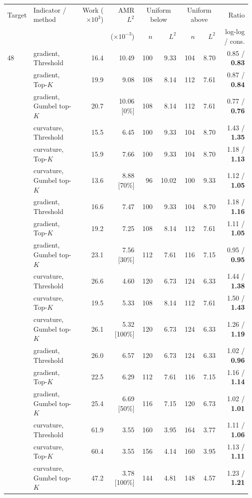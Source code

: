\begin{tabular}{llrrrrrrr}
\toprule
Target & Indicator / method & Work ($\times10^{3}$) & AMR $L^2$ & \multicolumn{2}{c}{Uniform below} & \multicolumn{2}{c}{Uniform above} & Ratio \\
 & & & ($\times10^{-3}$) & $n$ & $L^2$ & $n$ & $L^2$ & log-log / cons. \\
\midrule
48 & gradient, Threshold & 16.4 & 10.49 & 100 & 9.33 & 104 & 8.70 & 0.85 / \textbf{0.83} \\
 & gradient, Top-$K$ & 19.9 & 9.08 & 108 & 8.14 & 112 & 7.61 & 0.87 / \textbf{0.84} \\
 & gradient, Gumbel top-$K$ & 20.7 & 10.06 [0\%] & 108 & 8.14 & 112 & 7.61 & 0.77 / \textbf{0.76} \\
 & curvature, Threshold & 15.5 & 6.45 & 100 & 9.33 & 104 & 8.70 & 1.43 / \textbf{1.35} \\
 & curvature, Top-$K$ & 15.9 & 7.66 & 100 & 9.33 & 104 & 8.70 & 1.18 / \textbf{1.13} \\
 & curvature, Gumbel top-$K$ & 13.6 & 8.88 [70\%] & 96 & 10.02 & 100 & 9.33 & 1.12 / \textbf{1.05} \\
\addlinespace
64 & gradient, Threshold & 16.6 & 7.47 & 100 & 9.33 & 104 & 8.70 & 1.18 / \textbf{1.16} \\
 & gradient, Top-$K$ & 19.2 & 7.25 & 108 & 8.14 & 112 & 7.61 & 1.11 / \textbf{1.05} \\
 & gradient, Gumbel top-$K$ & 23.1 & 7.56 [30\%] & 112 & 7.61 & 116 & 7.15 & 0.95 / \textbf{0.95} \\
 & curvature, Threshold & 26.6 & 4.60 & 120 & 6.73 & 124 & 6.33 & 1.44 / \textbf{1.38} \\
 & curvature, Top-$K$ & 19.5 & 5.33 & 108 & 8.14 & 112 & 7.61 & 1.50 / \textbf{1.43} \\
 & curvature, Gumbel top-$K$ & 26.1 & 5.32 [100\%] & 120 & 6.73 & 124 & 6.33 & 1.26 / \textbf{1.19} \\
\addlinespace
80 & gradient, Threshold & 26.0 & 6.57 & 120 & 6.73 & 124 & 6.33 & 1.02 / \textbf{0.96} \\
 & gradient, Top-$K$ & 22.5 & 6.29 & 112 & 7.61 & 116 & 7.15 & 1.16 / \textbf{1.14} \\
 & gradient, Gumbel top-$K$ & 25.4 & 6.69 [50\%] & 116 & 7.15 & 120 & 6.73 & 1.02 / \textbf{1.01} \\
 & curvature, Threshold & 61.9 & 3.55 & 160 & 3.95 & 164 & 3.77 & 1.11 / \textbf{1.06} \\
 & curvature, Top-$K$ & 60.4 & 3.55 & 156 & 4.14 & 160 & 3.95 & 1.13 / \textbf{1.11} \\
 & curvature, Gumbel top-$K$ & 47.2 & 3.78 [100\%] & 144 & 4.81 & 148 & 4.57 & 1.23 / \textbf{1.21} \\
\bottomrule
\end{tabular}
